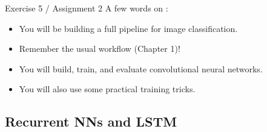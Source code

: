 \begin{frame}{Exercise 5 / Assignment 2}
	A few words on :
	\begin{itemize}
		\item You will be building a full pipeline for image classification.
		\item Remember the usual workflow (Chapter 1)!
		\item You will build, train, and evaluate convolutional neural networks.
		\item You will also use some practical training tricks.
	\end{itemize}
\end{frame}


\subsection{Recurrent NNs and LSTM}
